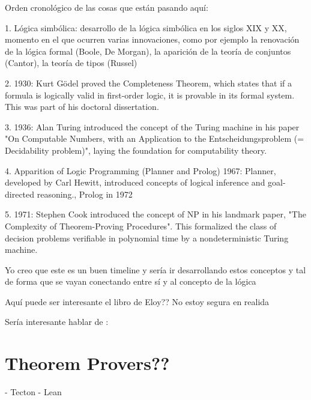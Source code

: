 \documentclass{article}
\begin{document}
Orden cronológico de las cosas que están pasando aquí:

1. Lógica simbólica: desarrollo de la
lógica simbólica en los siglos XIX y XX, momento en el que ocurren varias
innovaciones, como por ejemplo la renovación de la lógica formal (Boole, De
Morgan), la aparición de la teoría de conjuntos (Cantor), la teoría de tipos
(Russel)

2. 1930: Kurt Gödel proved the Completeness Theorem, which states that if a formula is logically valid in first-order logic, it is provable in its formal system. This was part of his doctoral dissertation.

3. 1936: Alan Turing introduced the concept of the Turing machine in his paper "On Computable Numbers, with an Application to the Entscheidungsproblem (= Decidability problem)", laying the foundation for computability theory.

4. Apparition of Logic Programming (Planner and Prolog) 
1967: Planner, developed by Carl Hewitt, introduced concepts of logical inference and goal-directed reasoning., Prolog in 1972

5. 1971: Stephen Cook introduced the concept of NP in his landmark paper, "The Complexity of Theorem-Proving Procedures". This formalized the class of decision problems verifiable in polynomial time by a nondeterministic Turing machine.

Yo creo que este es un buen timeline y sería ir desarrollando estos conceptos y tal de forma que se vayan conectando entre sí y al concepto de la lógica



Aquí puede ser interesante el libro de Eloy?? No estoy segura en realida

Sería interesante hablar de :


\section{Theorem Provers??}
- Tecton
- Lean



\renewcommand{\refname}{Referencias}


\end{document}
